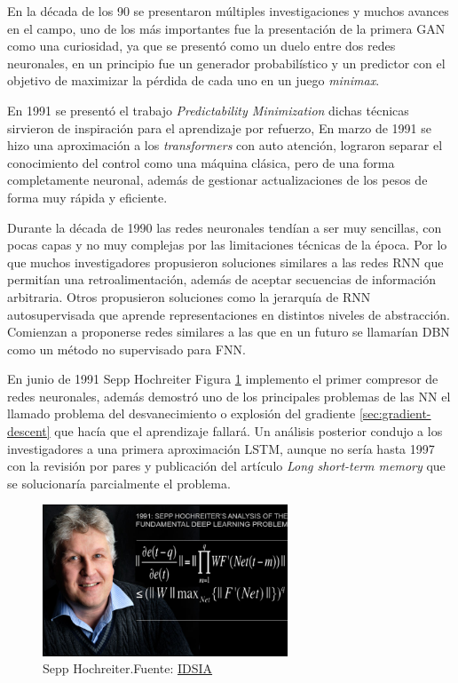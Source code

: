En la década de los 90 se presentaron múltiples investigaciones y muchos avances en el campo, uno de los más importantes fue la presentación de la primera \acrshort{GAN} como una curiosidad, ya que se presentó como un duelo entre dos redes neuronales, en un principio fue un generador probabilístico y un predictor con el objetivo de maximizar la pérdida de cada uno en un juego \textit{minimax}.

En 1991 se presentó el trabajo \textit{Predictability Minimization} \cite{urgen1991learning} dichas técnicas sirvieron de inspiración para el aprendizaje por refuerzo,
En marzo de 1991 se hizo una aproximación a los \textit{transformers} con auto atención, lograron separar el conocimiento del control como una máquina clásica, pero de una forma completamente neuronal, además de gestionar actualizaciones de los pesos de forma muy rápida y eficiente.

Durante la década de 1990 las redes neuronales tendían a ser muy sencillas, con pocas capas y no muy complejas por las limitaciones técnicas de la época.
Por lo que muchos investigadores propusieron soluciones similares a las redes \acrshort{RNN} que permitían una retroalimentación, además de aceptar secuencias de información arbitraria.
Otros propusieron soluciones como la jerarquía de \acrshort{RNN} autosupervisada que aprende representaciones en distintos niveles de abstracción.
Comienzan a proponerse redes similares a las que en un futuro se llamarían \acrshort{DBN} como un método no supervisado para \acrshort{FNN}.

En junio de 1991 {Sepp Hochreiter} Figura \ref{fig:sepp-hochreiter} implemento el primer compresor de redes neuronales, además demostró uno de los principales problemas de las \acrshort{NN} el llamado problema del desvanecimiento o explosión del gradiente \ref{sec:gradient-descent} que hacía que el aprendizaje fallará.
Un análisis posterior condujo a los investigadores a una primera aproximación \acrshort{LSTM}, aunque no sería hasta 1997 con la revisión por pares y publicación del artículo \textit{Long short-term memory} \cite{hochreiter1997long} que se solucionaría parcialmente el problema.

\begin{figure}[H]
    \centering
    \includegraphics[width=0.65\textwidth]{figures/Sepp Hochreiter.jpg}
    \caption{Sepp Hochreiter.\newline{}Fuente: \href{https://people.idsia.ch/~juergen/fundamentaldeeplearningproblem.html}{IDSIA}}
    \label{fig:sepp-hochreiter}
\end{figure}

